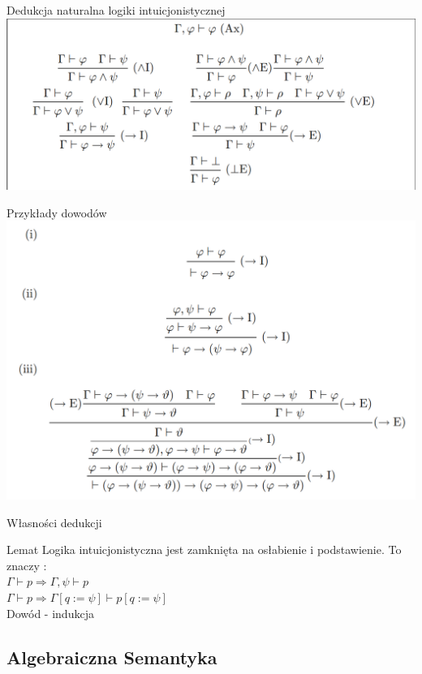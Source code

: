 \documentclass{beamer}
\begin{document}
\begin{frame}{Dedukcja naturalna logiki intuicjonistycznej}
 \includegraphics[scale=0.25]{dedukcja.png}
\end{frame}

\begin{frame}{Przykłady dowodów}
 \includegraphics[scale=0.25]{dowoddedukcja.png}
\end{frame}

\begin{frame}{Własności dedukcji}
 \begin{block}{Lemat}
 	Logika intuicjonistyczna jest zamknięta na osłabienie i podstawienie. To znaczy : \\
 	\( \Gamma \vdash p \Rightarrow \Gamma, \psi \vdash p\)\\
 	\( \Gamma \vdash p  \Rightarrow \Gamma [ q := \psi ] \vdash p[ q:= \psi ]\)\\
 	Dowód - indukcja
 \end{block}
\end{frame}

\subsection{Algebraiczna Semantyka}
\end{document}
